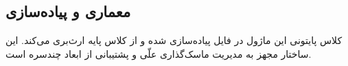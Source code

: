 \subsection{معماری و پیاده‌سازی}
کلاس پایتونی این ماژول در فایل  پیاده‌سازی شده و از کلاس پایه  ارث‌بری می‌کند. این ساختار مجهز به مدیریت ماسک‌گذاری علّی و پشتیبانی از ابعاد چندسره است.
